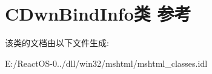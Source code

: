 \hypertarget{class_c_dwn_bind_info}{}\section{C\+Dwn\+Bind\+Info类 参考}
\label{class_c_dwn_bind_info}


该类的文档由以下文件生成\+:\begin{DoxyCompactItemize}
\item 
E\+:/\+React\+O\+S-\/0../dll/win32/mshtml/mshtml\+\_\+classes.\+idl\end{DoxyCompactItemize}
